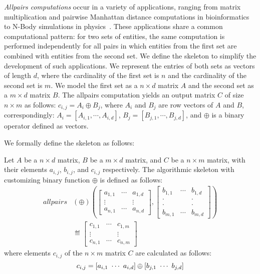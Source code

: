 \emph{Allpairs computations} occur in a variety of applications, ranging from matrix multiplication and pairwise Manhattan distance computations in bioinformatics~\cite{ChangDeQuRo2009} to N-Body simulations in physics~\cite{AroraShVu2009}.
These applications share a common computational pattern:
for two sets of entities, the same computation is performed independently for all pairs in which entities from the first set are combined with entities from the second set.
We define the \allpairs skeleton to simplify the development of such applications.
We represent the entries of both sets as vectors of length $d$, where the cardinality of the first set is $n$ and the cardinality of the second set is $m$.
We model the first set as a $n\times d$ matrix $A$ and the second set as a $m\times d$ matrix $B$.
The allpairs computation yields an output matrix $C$ of size $n\times m$ as follows:
$c_{i, j} = A_i \oplus B_j$, where $A_i$ and $B_j$ are row vectors of $A$ and $B$, correspondingly:
$A_i = [A_{i,1}, \cdots, A_{i, d}]$, $B_j = [B_{j,1}, \cdots, B_{j,d}]$, and $\oplus$ is a binary operator defined as vectors.

We formally define the \allpairs skeleton as follows:

\begin{definition}
  \label{def:allpairs}
  Let $A$ be a $n\times d$ matrix, $B$ be a $m\times d$ matrix, and $C$ be a $n\times m$ matrix, with their elements $a_{i,j}$, $b_{i,j}$, and $c_{i,j}$ respectively.
  The algorithmic skeleton \allpairs with customizing binary function $\oplus$ is defined as follows:
  \begin{equation*}
    \begin{split}
    allpairs&(\oplus)\left(%
      \left[ \begin{array}{ccc} a_{1,1} & \cdots & a_{1,d}\\[.25em] \vdots & & \vdots\\[.25em] a_{n,1} & \cdots & a_{n,d} \end{array}\right], %
      \left[ \begin{array}{ccc} b_{1,1} & \cdots & b_{1,d}\\[-.25em] \cdot & & \cdot\\[-.75em] \cdot & & \cdot\\[-.25em] b_{m,1} & \cdots & b_{m,d} \end{array}\right]%
      \right)\\
    &\eqdef \left[ \begin{array}{ccc} c_{1,1} & \cdots & c_{1,m}\\[.25em] \vdots & & \vdots\\[.25em] c_{n,1} & \cdots & c_{n,m} \end{array} \right]
    \end{split}
  \end{equation*}
  where elements $c_{i,j}$ of the $n\times m$ matrix $C$ are calculated as follows:
  \[
    c_{i,j} = \left[a_{i,1}\ \cdots\ a_{i,d}\right] \oplus \left[b_{j,1}\ \cdots\ b_{j,d}\right]
  \]
\end{definition}

